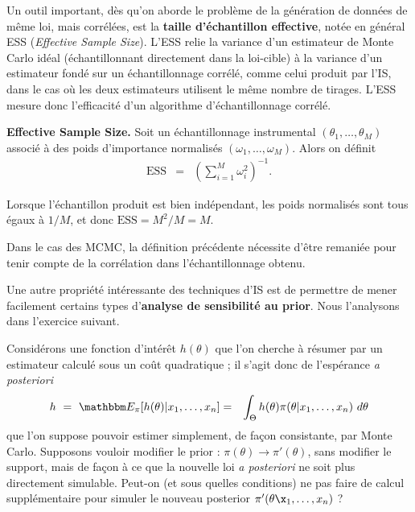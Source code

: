 Un outil important, dès qu'on aborde le problème de la génération de données de même loi, mais corrélées, est la {\bf taille d'échantillon effective}, notée en général ESS (\emph{Effective Sample Size}). L'ESS relie la variance d'un estimateur de Monte Carlo idéal (échantillonnant directement dans la loi-cible) à la variance d'un estimateur fondé sur un échantillonnage corrélé, comme celui produit par l'IS, dans le cas où les deux estimateurs utilisent le même nombre de tirages. L'ESS mesure donc l'efficacité d'un algorithme d'échantillonnage corrélé. \\

\begin{definition}{\bf Effective Sample Size.}
Soit un échantillonnage instrumental $(\theta_1,\ldots,\theta_M)$ associé à des poids d'importance normalisés $(\omega_1,\ldots,\omega_M)$. Alors on définit
\begin{eqnarray*}
\mbox{ESS} & = & \left(\sum\limits_{i=1}^M \omega^2_i\right)^{-1}.
\end{eqnarray*}
\end{definition}

Lorsque l'échantillon produit est bien indépendant, les poids normalisés sont tous égaux à $1/M$, et donc $\mbox{ESS}=M^2/M=M$. \\

\begin{remark}
Dans le cas des MCMC, la définition précédente nécessite d'être remaniée pour tenir compte de la corrélation dans l'échantillonnage obtenu. \\
\end{remark}

Une autre propriété intéressante des techniques d'IS est de permettre de mener facilement certains types d'\textbf{analyse de sensibilité au prior}. Nous l'analysons dans l'exercice suivant.

\begin{exec}
Considérons une fonction d'intérêt $h(\theta)$ que l'on cherche à résumer par un estimateur calculé sous un coût quadratique ; il s'agit donc de l'espérance {\it a posteriori}
\begin{eqnarray}
h \ = \ \E_{\pi}[h(\theta)|x_1,\ldots,x_n] & = & \int_{\Theta} h(\theta)\pi(\theta|x_1,\ldots,x_n) \ d\theta\label{IS.estim1}
\end{eqnarray}
que l'on suppose pouvoir estimer simplement, de fa\c con consistante, par Monte Carlo. Supposons vouloir modifier le prior : $\pi(\theta)\to\pi'(\theta)$, sans modifier le support, mais de fa\c con à ce que la nouvelle loi {\it a posteriori} ne soit plus directement simulable. Peut-on (et sous quelles conditions) ne pas faire de calcul supplémentaire pour simuler le nouveau posterior $\pi'(\theta\x_1,\ldots,x_n)$ ?
\end{exec}


